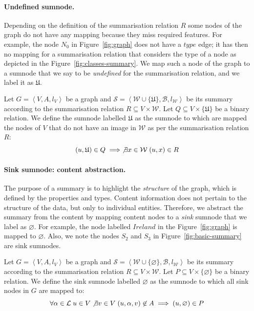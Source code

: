 \paragraph{Undefined sumnode.}

Depending on the definition of the summarisation relation $R$ some nodes of the graph do not have any mapping because they miss required features. For example, the node $N_0$ in Figure~\ref{fig:graph} does not have a $type$ edge; it has then no mapping for a summarisation relation that considers the type of a node as depicted in the Figure~\ref{fig:classes-summary}.
We map such a node of the graph to a sumnode that we say to be \emph{undefined} for the summarisation relation, and we label it as $\mathfrak{U}$.

\begin{definition}
Let $G=\left\langle V, A, l_V \right\rangle$ be a graph and $\mathcal{S}=\left\langle \mathcal{W} \cup \{ \mathfrak{U} \}, \mathcal{B}, l_\mathcal{W} \right\rangle$ be its summary according to the summarisation relation $R \subseteq V \times \mathcal{W}$.
Let $Q \subseteq V \times \{ \mathfrak{U} \}$ be a binary relation.
We define the sumnode labelled $\mathfrak{U}$ as the sumnode to which are mapped the nodes of $V$ that do not have an image in $\mathcal{W}$ as per the summarisation relation $R$:
$$
(u, \mathfrak{U}) \in Q \implies \not \exists x \in \mathcal{W}\; (u, x) \in R
$$
\end{definition}

\paragraph{Sink sumnode: content abstraction.}

The purpose of a summary is to highlight the \emph{structure} of the graph, which is defined by the properties and types. Content information does not pertain to the structure of the data, but only to individual entities. Therefore, we abstract the summary from the content by mapping content nodes to a \emph{sink} sumnode that we label as $\varnothing$. For example, the node labelled $Ireland$ in the Figure~\ref{fig:graph} is mapped to $\varnothing$. Also, we note the nodes $S_2$ and $S_3$ in Figure~\ref{fig:basic-summary} are sink sumnodes.

\begin{definition}
Let $G=\left\langle V, A, l_V \right\rangle$ be a graph and $\mathcal{S}=\left\langle \mathcal{W} \cup \{ \varnothing \}, \mathcal{B}, l_\mathcal{W} \right\rangle$ be its summary according to the summarisation relation $R \subseteq V \times \mathcal{W}$.
Let $P \subseteq V \times \{ \varnothing \}$ be a binary relation.
We define the sink sumnode labelled $\varnothing$ as the sumnode to which all sink nodes in $G$ are mapped to:
$$
\forall \alpha \in \mathcal{L}\; u \in V \not \exists v \in V\; (u, \alpha, v) \not \in A \implies (u, \varnothing) \in P
$$
\end{definition}


